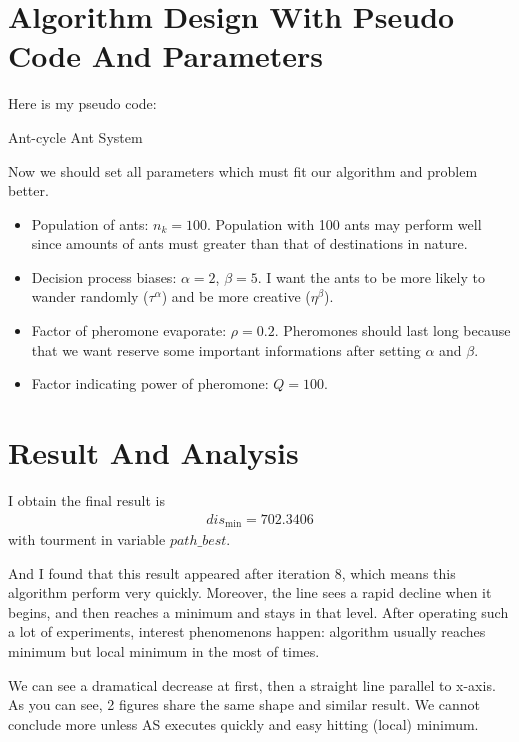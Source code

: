 \documentclass{article}
\begin{document}
\section{Algorithm Design With Pseudo Code And Parameters}
Here is my pseudo code:
\par
\begin{algorithm}[H]
    \caption{Ant-cycle Ant System}
\end{algorithm}
\par
Now we should set all parameters which must fit our algorithm and problem better.
\begin{itemize}
    \item Population of ants: $n_k = 100$. 
    Population with 100 ants may perform well since amounts of ants must greater than that of destinations in nature.
    \item Decision process biases: $\alpha = 2$, $\beta = 5$.
    I want the ants to be more likely to wander randomly ($\tau^{\alpha}$) and be more creative ($\eta^{\beta}$).
    \item Factor of pheromone evaporate: $\rho = 0.2$.
    Pheromones should last long because that we want reserve some important informations after setting $\alpha$ and $\beta$.
    \item Factor indicating power of pheromone: $Q = 100$.
\end{itemize}

\section{Result And Analysis}
I obtain the final result is 
\begin{align*}
    dis_{\min} = 702.3406
\end{align*}
with tourment in variable $path\_best$.
\par
And I found that this result appeared after iteration 8, which means this algorithm perform very quickly.
Moreover, the line sees a rapid decline when it begins, and then reaches a minimum and stays in that level.
After operating such a lot of experiments, interest phenomenons happen:
algorithm usually reaches minimum but local minimum in the most of times.
\par
We can see a dramatical decrease at first, then a straight line parallel to x-axis.
As you can see, 2 figures share the same shape and similar result.
We cannot conclude more unless AS executes quickly and easy hitting (local) minimum.
\par
\end{document}
